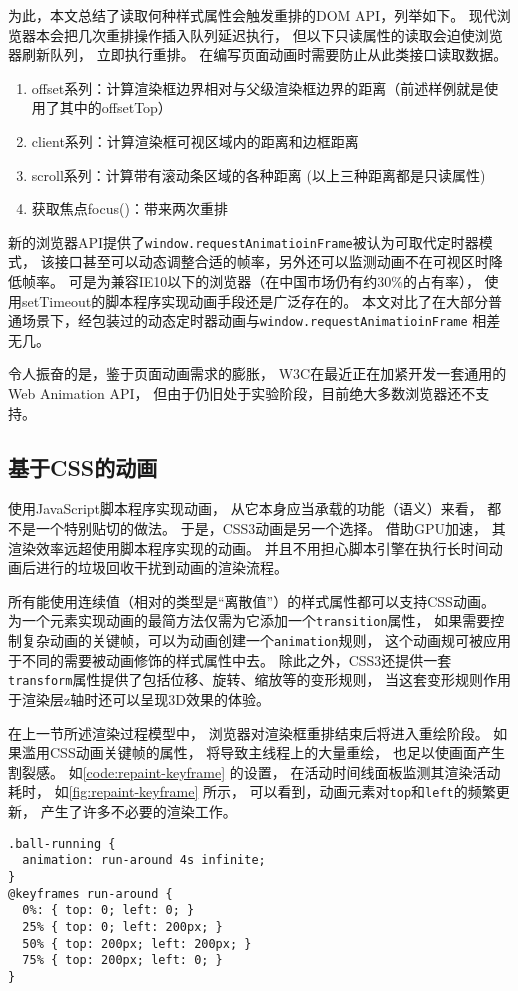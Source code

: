 为此，本文总结了读取何种样式属性会触发重排的DOM API，列举如下。
现代浏览器本会把几次重排操作插入队列延迟执行，
但以下只读属性的读取会迫使浏览器刷新队列，
立即执行重排。
在编写页面动画时需要防止从此类接口读取数据。
\begin{enumerate}
    \item offset系列：计算渲染框边界相对与父级渲染框边界的距离（前述样例就是使用了其中的offsetTop）
    \item client系列：计算渲染框可视区域内的距离和边框距离
    \item scroll系列：计算带有滚动条区域的各种距离 (以上三种距离都是只读属性)
    \item 获取焦点focus()：带来两次重排
\end{enumerate}

新的浏览器API提供了\texttt{window.requestAnimatioinFrame}被认为可取代定时器模式，
该接口甚至可以动态调整合适的帧率，另外还可以监测动画不在可视区时降低帧率。
可是为兼容IE10以下的浏览器（在中国市场仍有约30\%的占有率），
使用setTimeout的脚本程序实现动画手段还是广泛存在的。
本文对比了在大部分普通场景下，经包装过的动态定时器动画与\texttt{window.requestAnimatioinFrame}
相差无几。

令人振奋的是，鉴于页面动画需求的膨胀，
W3C在最近正在加紧开发一套通用的 Web Animation API，
但由于仍旧处于实验阶段，目前绝大多数浏览器还不支持。

\subsection{基于CSS的动画}\label{sec:no-repaint}

使用JavaScript脚本程序实现动画，
从它本身应当承载的功能（语义）来看，
都不是一个特别贴切的做法。
于是，CSS3动画是另一个选择。
借助GPU加速，
其渲染效率远超使用脚本程序实现的动画。
并且不用担心脚本引擎在执行长时间动画后进行的垃圾回收干扰到动画的渲染流程。

所有能使用连续值（相对的类型是``离散值''）的样式属性都可以支持CSS动画。
为一个元素实现动画的最简方法仅需为它添加一个\texttt{transition}属性，
如果需要控制复杂动画的关键帧，可以为动画创建一个\texttt{animation}规则，
这个动画规可被应用于不同的需要被动画修饰的样式属性中去。
除此之外，CSS3还提供一套\texttt{transform}属性提供了包括位移、旋转、缩放等的变形规则，
当这套变形规则作用于渲染层z轴时还可以呈现3D效果的体验。

在上一节所述渲染过程模型中，
浏览器对渲染框重排结束后将进入重绘阶段。
如果滥用CSS动画关键帧的属性，
将导致主线程上的大量重绘，
也足以使画面产生割裂感\cite{garaizar2014presentation}。
如\autoref{code:repaint-keyframe} 的设置，
在活动时间线面板监测其渲染活动耗时，
如\autoref{fig:repaint-keyframe} 所示，
可以看到，动画元素对\texttt{top}和\texttt{left}的频繁更新，
产生了许多不必要的渲染工作。
\begin{lstlisting}[label=code:repaint-keyframe, caption=频繁触发重绘的样例]
.ball-running {
  animation: run-around 4s infinite;
}
@keyframes run-around {
  0%: { top: 0; left: 0; }
  25% { top: 0; left: 200px; }
  50% { top: 200px; left: 200px; } 
  75% { top: 200px; left: 0; }
}
\end{lstlisting}

